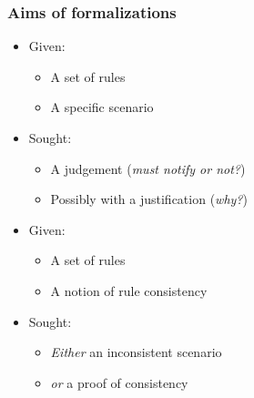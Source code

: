 \documentclass{beamer}
\begin{document}
\begin{frame}[fragile]\frametitle{Aims of formalizations}

  \begin{itemize}
  \item Given:
    \begin{itemize}
    \item A set of rules
    \item A specific scenario
    \end{itemize}
  \item Sought: 
    \begin{itemize}
    \item A judgement (\emph{must notify or not?})
    \item Possibly with a justification (\emph{why?})
    \end{itemize}
  \end{itemize}

  \vspace{4mm}
  \begin{itemize}
  \item Given:
    \begin{itemize}
    \item A set of rules
    \item A notion of rule consistency
    \end{itemize}
  \item Sought: 
    \begin{itemize}
    \item \emph{Either} an inconsistent scenario 
    \item \emph{or} a proof of consistency
    \end{itemize}
  \end{itemize}

\end{frame}
\end{document}
